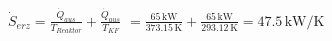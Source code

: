 \( \dot{S}_{erz} = \frac{\dot{Q}_{aus}}{T_{Reaktor}} + \frac{\dot{Q}_{aus}}{T_{KF}} \)  
\( = \frac{65 \, \text{kW}}{373.15 \, \text{K}} + \frac{65 \, \text{kW}}{293.12 \, \text{K}} = 47.5 \, \text{kW/K} \)